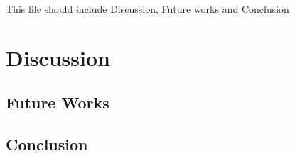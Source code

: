This file should include Discussion, Future works and Conclusion
\chapter{Discussion}


\section {Future Works}


\section {Conclusion}
